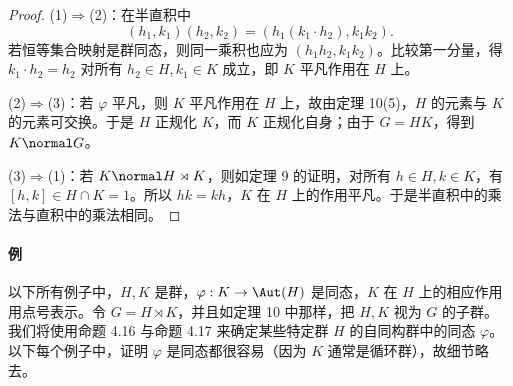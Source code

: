 \begin{proof}
(1)$\Rightarrow$(2)：在半直积中
\[
  (h_1,k_1)(h_2,k_2)=(h_1(k_1\cdot h_2),k_1k_2).
\]
若恒等集合映射是群同态，则同一乘积也应为 $(h_1h_2,k_1k_2)$。比较第一分量，得 $k_1\cdot h_2=h_2$ 对所有 $h_2\in H,k_1\in K$ 成立，即 $K$ 平凡作用在 $H$ 上。

(2)$\Rightarrow$(3)：若 $\varphi$ 平凡，则 $K$ 平凡作用在 $H$ 上，故由定理 10(5)，$H$ 的元素与 $K$ 的元素可交换。于是 $H$ 正规化 $K$，而 $K$ 正规化自身；由于 $G=HK$，得到 $K\normal G$。

(3)$\Rightarrow$(1)：若 $K\normal H\rtimes K$，则如定理 9 的证明，对所有 $h\in H,k\in K$，有 $[h,k]\in H\cap K=1$。所以 $hk=kh$，$K$ 在 $H$ 上的作用平凡。于是半直积中的乘法与直积中的乘法相同。
\end{proof}


\paragraph{例}
以下所有例子中，$H,K$ 是群，$\varphi:K\to\Aut(H)$ 是同态，$K$ 在 $H$ 上的相应作用用点号表示。令 $G=H\rtimes K$，并且如定理 10 中那样，把 $H,K$ 视为 $G$ 的子群。我们将使用命题 4.16 与命题 4.17 来确定某些特定群 $H$ 的自同构群中的同态 $\varphi$。以下每个例子中，证明 $\varphi$ 是同态都很容易（因为 $K$ 通常是循环群），故细节略去。
